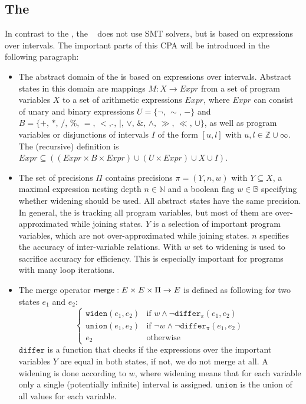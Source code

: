 \begin{itemize}
\end{itemize}

\subsection{The \InvariantsCPA{}}
In contrast to the \PredicateCPA{}, the \InvariantsCPA{}~\cite{Beyer:InvariantsCPA} does not use \ac{SMT} solvers, but is based on expressions over intervals. The important parts of this CPA will be introduced in the following paragraph:

\begin{itemize}
\item The abstract domain of the \InvariantsCPA{} is based on expressions over intervals. Abstract states in this domain are mappings $M: X \rightarrow Expr$ from a set of program variables $X$ to a set of arithmetic expressions $Expr$, where $Expr$ can consist of unary and binary expressions $U = \{\neg,\,\sim,\,-\}$ and $B = \{+,\,*,\,/,\,\%,\,=,\,<,\,\hat{},\,|,\,\lor,\,\&,\,\land,\,\gg,\,\ll,\,\cup\}$, as well as program variables or disjunctions of intervals $I$ of the form $[u, l]$ with $u, l \in \mathbb{Z} \cup \infty$. The (recursive) definition is $Expr \subseteq ((Expr \times B \times Expr) \cup (U \times Expr) \cup X \cup I)$.

\item The set of precisions $\Pi$ contains precisions $\pi = (Y, n, w)$ with $Y \subseteq X$, a maximal expression nesting depth $n \in \mathbb{N}$
and a boolean flag $w \in \mathbb{B}$ specifying whether widening should be used. All abstract states have the same precision. In general, the \InvariantsCPA{}
is tracking all program variables, but most of them are over-approximated while joining states. $Y$ is a selection of important program variables, which are not
over-approximated while joining states. $n$ specifies the accuracy of inter-variable relations. With $w$
set to \true{} widening is used to sacrifice accuracy for efficiency. This is especially important for programs with many loop iterations.

\item The merge operator $\operatorname{\mathsf{merge}} : E \times E \times \Pi \rightarrow E$ is defined as following for two states $e_1$ and $e_2$:
\begin{displaymath}
\begin{cases}
\mathtt{widen}(e_1, e_2) & \text{if } w \land \neg \mathtt{differ}_\pi(e_1, e_2)\\
\mathtt{union}(e_1, e_2) & \text{if } \neg w \land \neg \mathtt{differ}_\pi(e_1, e_2)\\
e_2 & \text{otherwise}
\end{cases}
\end{displaymath}
$\mathtt{differ}$ is a function that checks if the expressions over the important variables $Y$ are equal in both states, if not, we do not merge at all.
A widening is done according to $w$, where widening means that for each variable only a single (potentially infinite) interval is assigned. $\mathtt{union}$
is the union of all values for each variable.
\end{itemize}

